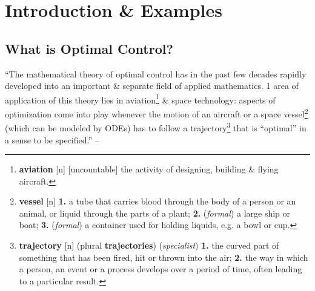 \documentclass[oneside]{book}
\numberwithin{equation}{section}
\begin{document}
\section{Introduction \& Examples}

\subsection{What is Optimal Control?}
``The mathematical theory of optimal control has in the past few decades rapidly developed into an important \& separate field of applied mathematics. 1 area of application of this theory lies in aviation\footnote{\textbf{aviation} [n] [uncountable] the activity of designing, building \& flying aircraft.} \& space technology: aspects of optimization come into play whenever the motion of an aircraft or a space vessel\footnote{\textbf{vessel} [n] \textbf{1.} a tube that carries blood through the body of a person or an animal, or liquid through the parts of a plant; \textbf{2.} (\textit{formal}) a large ship or boat; \textbf{3.} (\textit{formal}) a container used for holding liquids, e.g. a bowl or cup.} (which can be modeled by ODEs) has to follow a trajectory\footnote{\textbf{trajectory} [n] (plural \textbf{trajectories}) (\textit{specialist}) \textbf{1.} the curved part of something that has been fired, hit or thrown into the air; \textbf{2.} the way in which a person, an event or a process develops over a period of time, often leading to a particular result.} that is ``optimal'' in a sense to be specified.'' -- \cite[Sect. 1.1: \textit{What is optimal control?}, p. 1]{Troltzsch2010}
\end{document}
